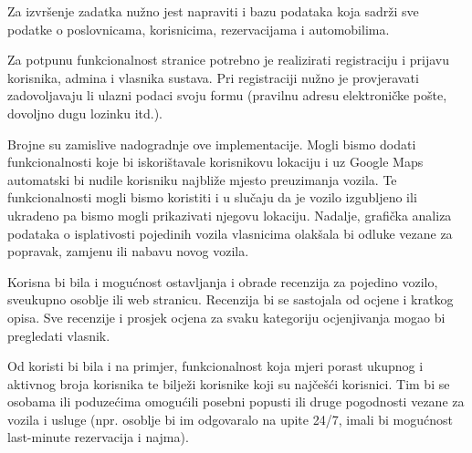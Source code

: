  \text Za izvršenje zadatka nužno jest napraviti i bazu podataka koja sadrži sve podatke o poslovnicama, korisnicima, rezervacijama i automobilima. \par
 \text Za potpunu funkcionalnost stranice potrebno je realizirati registraciju i prijavu korisnika, admina i vlasnika sustava. Pri registraciji nužno je provjeravati zadovoljavaju li ulazni podaci svoju formu (pravilnu adresu elektroničke pošte, dovoljno dugu lozinku itd.).\par
 \text Brojne su zamislive nadogradnje ove implementacije. Mogli bismo dodati funkcionalnosti koje bi iskorištavale korisnikovu lokaciju i uz Google Maps automatski bi nudile korisniku najbliže mjesto preuzimanja vozila. Te funkcionalnosti mogli bismo koristiti i u slučaju da je vozilo izgubljeno ili ukradeno pa bismo mogli prikazivati njegovu lokaciju. 
\text Nadalje, grafička analiza podataka o isplativosti pojedinih vozila vlasnicima olakšala bi odluke vezane za popravak, zamjenu ili nabavu novog vozila. \par 
\text Korisna bi bila i mogućnost ostavljanja i obrade recenzija za pojedino vozilo, sveukupno osoblje ili web stranicu. Recenzija bi se sastojala od ocjene i kratkog opisa. Sve recenzije i prosjek ocjena za svaku kategoriju ocjenjivanja mogao bi pregledati vlasnik. \par 
\text Od koristi bi bila i na primjer, funkcionalnost koja mjeri porast ukupnog i aktivnog broja korisnika te bilježi korisnike koji su najčešći korisnici. Tim bi se osobama ili poduzećima omogućili posebni popusti ili druge pogodnosti vezane za vozila i usluge (npr. osoblje bi im odgovaralo na upite 24/7, imali bi mogućnost last-minute rezervacija i najma).   \par  
		\eject
		
		
		
	